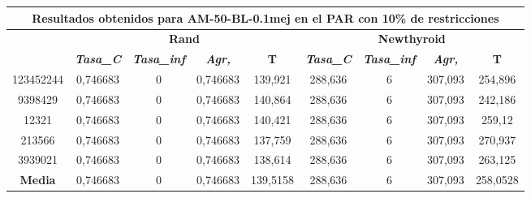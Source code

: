 \documentclass[12pt, spanish]{article}
\begin{document}
\begin{table}[H]
\footnotesize
\begin{tabular}{|c|c|c|c|c|c|c|c|c|}
\hline
\multicolumn{9}{|c|}{\textbf{Resultados obtenidos para AM-50-BL-0.1mej en el PAR con 10\% de restricciones}}                                                                                                      \\ \hline
\multirow{2}{*}{} & \multicolumn{4}{c|}{\textbf{Rand}}                                                            & \multicolumn{4}{c|}{\textbf{Newthyroid}}                                                      \\ \cline{2-9} 
                  & \textit{\textbf{Tasa\_C}} & \textit{\textbf{Tasa\_inf}} & \textit{\textbf{Agr,}} & \textbf{T} & \textit{\textbf{Tasa\_C}} & \textit{\textbf{Tasa\_inf}} & \textit{\textbf{Agr,}} & \textbf{T} \\ \hline
123452244         & 0,746683                  & 0                           & 0,746683               & 139,921    & 288,636                   & 6                           & 307,093                & 254,896    \\ \hline
9398429           & 0,746683                  & 0                           & 0,746683               & 140,864    & 288,636                   & 6                           & 307,093                & 242,186    \\ \hline
12321             & 0,746683                  & 0                           & 0,746683               & 140,421    & 288,636                   & 6                           & 307,093                & 259,12     \\ \hline
213566            & 0,746683                  & 0                           & 0,746683               & 137,759    & 288,636                   & 6                           & 307,093                & 270,937    \\ \hline
3939021           & 0,746683                  & 0                           & 0,746683               & 138,614    & 288,636                   & 6                           & 307,093                & 263,125    \\ \hline
\textbf{Media}    & 0,746683                  & 0                           & 0,746683               & 139,5158   & 288,636                   & 6                           & 307,093                & 258,0528   \\ \hline
\end{tabular}
\end{table}
\end{document}
